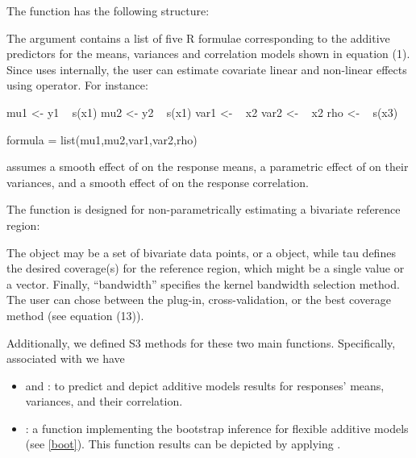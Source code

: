 The  function has the following structure:

\begin{center}
\end{center}

The  argument contains a list of five R formulae corresponding to the additive predictors for the means, variances and correlation models shown in equation (1). Since  uses  internally, the user can estimate covariate linear and non-linear effects using  operator. For instance:

\begin{example}
mu1 <- y1 ~ s(x1)
mu2 <- y2 ~ s(x1)
var1 <- ~ x2
var2 <- ~ x2
rho <- ~ s(x3)
	
formula = list(mu1,mu2,var1,var2,rho)
\end{example} 

\noindent assumes a smooth effect of  on the response means, a parametric effect of  on their variances, and a smooth effect of  on the response correlation.

The  function is designed for non-parametrically estimating a bivariate reference region:


\begin{center}
\end{center}

The object may be a set of bivariate data points, or a  object, while tau defines the desired coverage(s) for the reference region, which might be a single value or a vector. Finally, ``bandwidth'' specifies the kernel bandwidth selection method. The user can chose between the plug-in, cross-validation, or the best coverage method (see equation (13)).
 

Additionally, we defined S3 methods for these two main functions. Specifically, associated with  we have
	

\begin{itemize}
\item {} and : to predict and depict additive models results for responses' means, variances, and their correlation.
\item {}: a function implementing the bootstrap inference for flexible additive models (see \eqref{boot}). This function results can be depicted by applying . 
\end{itemize}

